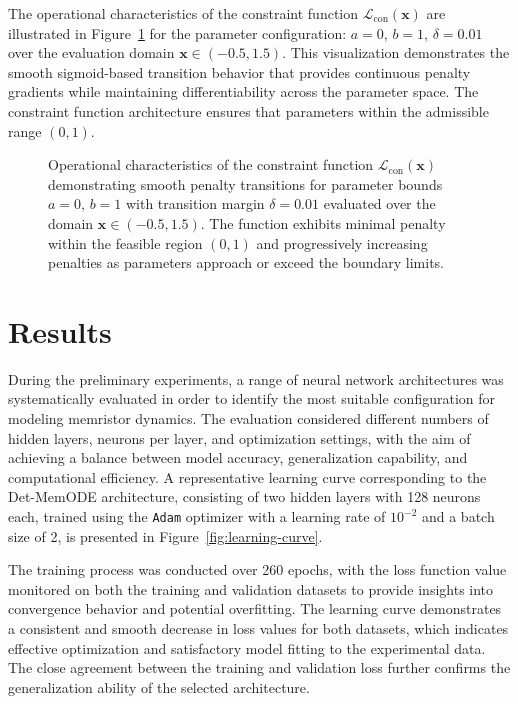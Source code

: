 \documentclass[11pt, oneside]{article}
\begin{document}
The operational characteristics of the constraint function $\mathcal{L}_{\mathrm{con}}(\mathbf{x})$ are illustrated in Figure~\ref{fig:constrains} for the parameter configuration: $a=0$, $b=1$, $\delta=0.01$ over the evaluation domain $\mathbf{x} \in (-0.5, 1.5)$. This visualization demonstrates the smooth sigmoid-based transition behavior that provides continuous penalty gradients while maintaining differentiability across the parameter space. The constraint function architecture ensures that parameters within the admissible range $(0,1)$.

\begin{figure}[H]
    \centering
    \resizebox{0.5\linewidth}{!}{%
        
    }
    \caption{Operational characteristics of the constraint function $\mathcal{L}_{\mathrm{con}}(\mathbf{x})$ demonstrating smooth penalty transitions for parameter bounds $a=0$, $b=1$ with transition margin $\delta=0.01$ evaluated over the domain $\mathbf{x} \in (-0.5, 1.5)$. The function exhibits minimal penalty within the feasible region $(0,1)$ and progressively increasing penalties as parameters approach or exceed the boundary limits.}
    \label{fig:constrains}
\end{figure}





\section{Results}

During the preliminary experiments, a range of neural network architectures was systematically evaluated in order to identify the most suitable configuration for modeling memristor dynamics. The evaluation considered different numbers of hidden layers, neurons per layer, and optimization settings, with the aim of achieving a balance between model accuracy, generalization capability, and computational efficiency. A representative learning curve corresponding to the Det-MemODE architecture, consisting of two hidden layers with 128 neurons each, trained using the \verb|Adam| optimizer with a learning rate of $10^{-2}$ and a batch size of 2, is presented in Figure~\ref{fig:learning-curve}.

The training process was conducted over 260 epochs, with the loss function value monitored on both the training and validation datasets to provide insights into convergence behavior and potential overfitting. The learning curve demonstrates a consistent and smooth decrease in loss values for both datasets, which indicates effective optimization and satisfactory model fitting to the experimental data. The close agreement between the training and validation loss further confirms the generalization ability of the selected architecture.
\end{document}
